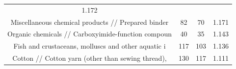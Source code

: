 \documentclass[10pt,]{article}
\begin{document}
\begin{longtable}[]{@{}cccc@{}}
\begin{minipage}[t]{0.09\columnwidth}
1.172\strut
\end{minipage}\tabularnewline
\begin{minipage}[t]{0.38\columnwidth}\centering\strut
Miscellaneous chemical products // Prepared binder\strut
\end{minipage} & \begin{minipage}[t]{0.21\columnwidth}\centering\strut
82\strut
\end{minipage} & \begin{minipage}[t]{0.20\columnwidth}\centering\strut
70\strut
\end{minipage} & \begin{minipage}[t]{0.09\columnwidth}\centering\strut
1.171\strut
\end{minipage}\tabularnewline
\begin{minipage}[t]{0.38\columnwidth}\centering\strut
Organic chemicals // Carboxyimide-function compoun\strut
\end{minipage} & \begin{minipage}[t]{0.21\columnwidth}\centering\strut
40\strut
\end{minipage} & \begin{minipage}[t]{0.20\columnwidth}\centering\strut
35\strut
\end{minipage} & \begin{minipage}[t]{0.09\columnwidth}\centering\strut
1.143\strut
\end{minipage}\tabularnewline
\begin{minipage}[t]{0.38\columnwidth}\centering\strut
Fish and crustaceans, molluscs and other aquatic i\strut
\end{minipage} & \begin{minipage}[t]{0.21\columnwidth}\centering\strut
117\strut
\end{minipage} & \begin{minipage}[t]{0.20\columnwidth}\centering\strut
103\strut
\end{minipage} & \begin{minipage}[t]{0.09\columnwidth}\centering\strut
1.136\strut
\end{minipage}\tabularnewline
\begin{minipage}[t]{0.38\columnwidth}\centering\strut
Cotton // Cotton yarn (other than sewing thread),\strut
\end{minipage} & \begin{minipage}[t]{0.21\columnwidth}\centering\strut
130\strut
\end{minipage} & \begin{minipage}[t]{0.20\columnwidth}\centering\strut
117\strut
\end{minipage} & \begin{minipage}[t]{0.09\columnwidth}\centering\strut
1.111\strut
\end{minipage}\tabularnewline
\bottomrule
\end{longtable}
\end{document}
